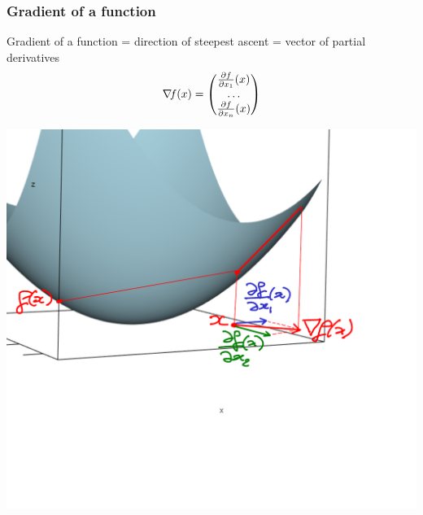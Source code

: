 \documentclass[12pt]{beamer}
\begin{document}
\begin{frame}
\frametitle{Gradient of a function} 
Gradient of a function = direction of steepest ascent = vector of partial derivatives
\begin{equation*}
\nabla\!{f}(x) = \begin{pmatrix} \frac{\partial f}{\partial x_1}(x) \\ \ldots \\ \frac{\partial f}{\partial x_n}(x) \end{pmatrix}
\end{equation*}
\begin{center}
\begin{minipage}[t]{0.7\textwidth}
\includegraphics[width=\textwidth]{gradient-crop.pdf} \\
\end{minipage}
\end{center}
\end{frame}
\end{document}
